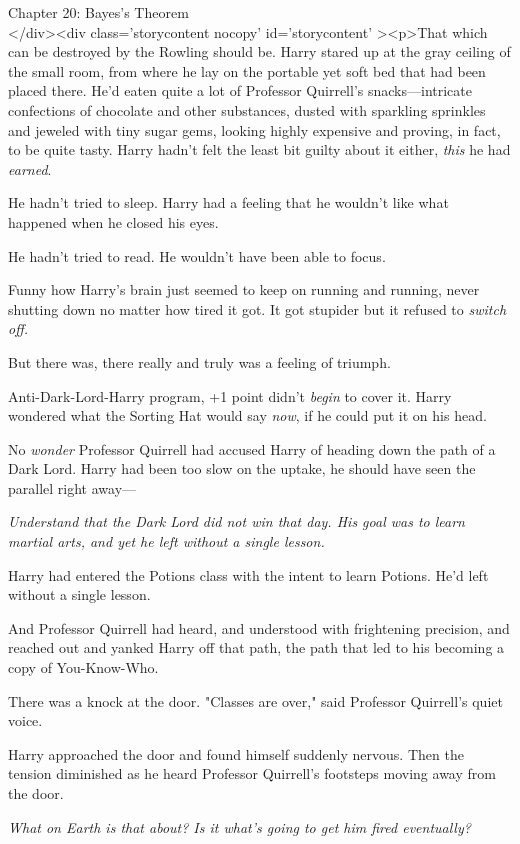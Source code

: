 
Chapter 20: Bayes's Theorem\\
</div><div  class='storycontent nocopy' id='storycontent' ><p>That which can be 
destroyed by the Rowling should be.
\sbreak
Harry stared up at the gray ceiling of the small room, from where he lay on the 
portable yet soft bed that had been placed there. He'd eaten quite a lot of 
Professor Quirrell's snacks---intricate confections of chocolate and other 
substances, dusted with sparkling sprinkles and jeweled with tiny sugar gems, 
looking highly expensive and proving, in fact, to be quite tasty. Harry hadn't 
felt the least bit guilty about it either, \emph{this} he had \emph{earned}.

He hadn't tried to sleep. Harry had a feeling that he wouldn't like what 
happened when he closed his eyes.

He hadn't tried to read. He wouldn't have been able to focus.

Funny how Harry's brain just seemed to keep on running and running, never 
shutting down no matter how tired it got. It got stupider but it refused to 
\emph{switch off.}

But there was, there really and truly was a feeling of triumph.

Anti-Dark-Lord-Harry program, +1 point didn't \emph{begin} to cover it. Harry 
wondered what the Sorting Hat would say \emph{now}, if he could put it on his 
head.

No \emph{wonder} Professor Quirrell had accused Harry of heading down the path 
of a Dark Lord. Harry had been too slow on the uptake, he should have seen the 
parallel right away---

\emph{Understand that the Dark Lord did not win that day. His goal was to learn 
martial arts, and yet he left without a single lesson.}

Harry had entered the Potions class with the intent to learn Potions. He'd left 
without a single lesson.

And Professor Quirrell had heard, and understood with frightening precision, 
and reached out and yanked Harry off that path, the path that led to his 
becoming a copy of You-Know-Who.

There was a knock at the door. "Classes are over," said Professor Quirrell's 
quiet voice.

Harry approached the door and found himself suddenly nervous. Then the tension 
diminished as he heard Professor Quirrell's footsteps moving away from the door.

\emph{What on Earth is that about? Is it what's going to get him fired 
eventually?}

